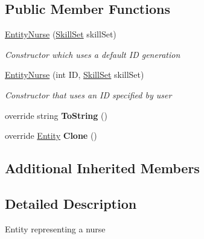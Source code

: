 \subsection*{Public Member Functions}
\begin{DoxyCompactItemize}
\item 
\hyperlink{class_general_health_care_elements_1_1_entities_1_1_entity_nurse_af13c129d408a1bd9d0fe809b9da7675c}{Entity\+Nurse} (\hyperlink{class_simulation_core_1_1_h_c_c_m_elements_1_1_skill_set}{Skill\+Set} skill\+Set)
\begin{DoxyCompactList}\small\item\em Constructor which uses a default ID generation \end{DoxyCompactList}\item 
\hyperlink{class_general_health_care_elements_1_1_entities_1_1_entity_nurse_a664e7a067cb7864d36b822b3c02aa27e}{Entity\+Nurse} (int ID, \hyperlink{class_simulation_core_1_1_h_c_c_m_elements_1_1_skill_set}{Skill\+Set} skill\+Set)
\begin{DoxyCompactList}\small\item\em Constructor that uses an ID specified by user \end{DoxyCompactList}\item 
override string {\bfseries To\+String} ()\hypertarget{class_general_health_care_elements_1_1_entities_1_1_entity_nurse_a8cd4c9005b52365a5bfd077d84feb83d}{}\label{class_general_health_care_elements_1_1_entities_1_1_entity_nurse_a8cd4c9005b52365a5bfd077d84feb83d}

\item 
override \hyperlink{class_simulation_core_1_1_h_c_c_m_elements_1_1_entity}{Entity} {\bfseries Clone} ()\hypertarget{class_general_health_care_elements_1_1_entities_1_1_entity_nurse_a94e331f6d3e826a9efff31413ae3d6ed}{}\label{class_general_health_care_elements_1_1_entities_1_1_entity_nurse_a94e331f6d3e826a9efff31413ae3d6ed}

\end{DoxyCompactItemize}
\subsection*{Additional Inherited Members}


\subsection{Detailed Description}
Entity representing a nurse 




